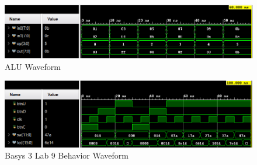\documentclass[11pt]{article}
\begin{document}
\begin{figure}[ht]\centering
	
	\includegraphics[width=1\textwidth,angle=0,origin=c]{ALU_test.PNG}
	\caption{ALU Waveform}
	\label{fig:sim_with_table}
	
\end{figure}

\begin{figure}[ht]\centering	
	
	\includegraphics[width=1\textwidth,angle=0,origin=c]{basys3_lab9_behavior.PNG}
	\caption{Basys 3 Lab 9 Behavior Waveform}
	\label{fig:sim_with_table}
	
\end{figure}
\end{document}
